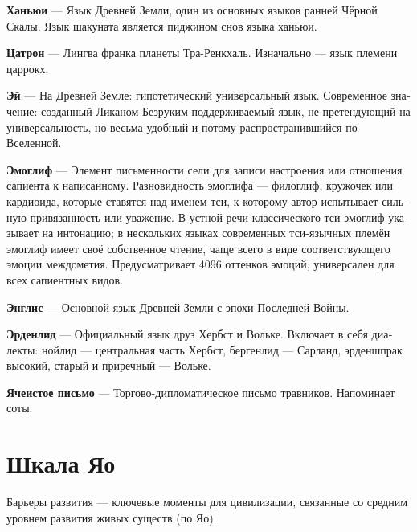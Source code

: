 \documentclass[a4paper,12pt,fleqn]{book}\usepackage{polyglossia}\setdefaultlanguage[babelshorthands=true]{russian}\setotherlanguage{english}\defaultfontfeatures{Ligatures=TeX,Mapping=tex-text}\usepackage{xcolor}\newcommand{\ml}[3]{#2}
\newcommand{\theterm}[3]{\textbf{\hypertarget{#1}{#2}} --- #3}
\begin{document}
\theterm{hanyui}
{Ханьюи}
{Язык Древней Земли, один из основных языков ранней Чёрной Скалы.
Язык шакуната является пиджином снов языка ханьюи.}

\theterm{tesatron}
{Цатрон}
{Лингва франка планеты Тра-Ренкхаль.
Изначально --- язык племени царрокх.}

\theterm{ej}
{Эй}
{На Древней Земле: гипотетический универсальный язык.
Современное значение: созданный Ликаном Безруким поддерживаемый язык, не претендующий на универсальность, но весьма удобный и потому распространившийся по Вселенной.}

\theterm{emoglyph}
{Эмоглиф}
{Элемент письменности сели для записи настроения или отношения сапиента к написанному.
Разновидность эмоглифа --- филоглиф, кружочек или кардиоида, которые ставятся над именем тси, к которому автор испытывает сильную привязанность или уважение.
В устной речи классического тси эмоглиф указывает на интонацию;
в нескольких языках современных тси-язычных племён эмоглиф имеет своё собственное чтение, чаще всего в виде соответствующего эмоции междометия.
Предусматривает 4096 оттенков эмоций, универсален для всех сапиентных видов.}

\theterm{englis}
{Энглис}
{Основной язык Древней Земли с эпохи Последней Войны.}

\theterm{erdenlied}
{Эрденлид}
{Официальный язык друз Хербст и Вольке.
Включает в себя диалекты: нойлид --- центральная часть Хербст, бергенлид --- Сарланд, эрденшпрак высокий, старый и приречный --- Вольке.}

\theterm{cell-script}
{Ячеистое письмо}
{Торгово-дипломатическое письмо травников.
Напоминает соты.}

\chapter{Шкала Яо}

Барьеры развития --- ключевые моменты для цивилизации, связанные со средним уровнем развития живых существ (по Яо).
\end{document}
